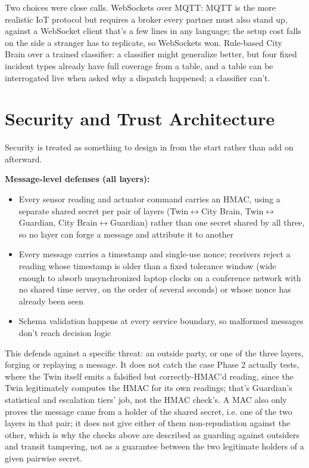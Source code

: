 \documentclass[10pt,letterpaper]{article}
\begin{document}
Two choices were close calls. WebSockets over MQTT: MQTT is the more realistic IoT protocol but requires a broker every partner must also stand up, against a WebSocket client that's a few lines in any language; the setup cost falls on the side a stranger has to replicate, so WebSockets won. Rule-based City Brain over a trained classifier: a classifier might generalize better, but four fixed incident types already have full coverage from a table, and a table can be interrogated live when asked why a dispatch happened; a classifier can't.

\section{Security and Trust Architecture}

Security is treated as something to design in from the start rather than add on afterward.

\textbf{Message-level defenses (all layers):}

\begin{itemize}[leftmargin=*]
\item Every sensor reading and actuator command carries an HMAC, using a separate shared secret per pair of layers (Twin$\leftrightarrow$City Brain, Twin$\leftrightarrow$Guardian, City Brain$\leftrightarrow$Guardian) rather than one secret shared by all three, so no layer can forge a message and attribute it to another
\item Every message carries a timestamp and single-use nonce; receivers reject a reading whose timestamp is older than a fixed tolerance window (wide enough to absorb unsynchronized laptop clocks on a conference network with no shared time server, on the order of several seconds) or whose nonce has already been seen
\item Schema validation happens at every service boundary, so malformed messages don't reach decision logic
\end{itemize}

This defends against a specific threat: an outside party, or one of the three layers, forging or replaying a message. It does not catch the case Phase 2 actually tests, where the Twin itself emits a falsified but correctly-HMAC'd reading, since the Twin legitimately computes the HMAC for its own readings; that's Guardian's statistical and escalation tiers' job, not the HMAC check's. A MAC also only proves the message came from a holder of the shared secret, i.e. one of the two layers in that pair; it does not give either of them non-repudiation against the other, which is why the checks above are described as guarding against outsiders and transit tampering, not as a guarantee between the two legitimate holders of a given pairwise secret.
\end{document}
